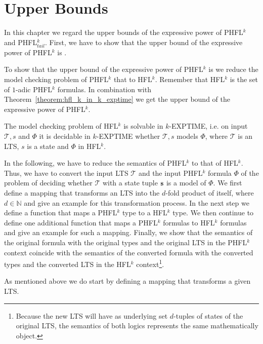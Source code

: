 
\chapter{Upper Bounds}\label{ch:upperBounds}

In this chapter we regard the upper bounds of the expressive power of PHFL$^k$ and PHFL$^k_{tail}$. First, we have to show that the upper
bound of the expressive power of PHFL$^k$ is .

To show that the upper bound of the expressive power of PHFL$^k$ is  we reduce the model checking
problem of PHFL$^k$ that to HFL$^k$. Remember that HFL$^k$ is the set of $1$-adic PHFL$^k$
formulas. In combination with Theorem~\ref{theorem:hfl_k_in_k_exptime} we get the upper bound of the expressive power of PHFL$^k$.

\begin{theorem}{\cite{axelsson2007complexity}}
    \label{theorem:hfl_k_in_k_exptime}
	The model checking problem of HFL$^k$ is solvable in $k$-EXPTIME, i.e. on input $\mathcal{T}, s$ and $\Phi$ it is decidable in $k$-EXPTIME whether $\mathcal{T}, s$ models $\Phi$, where $\mathcal{T}$ is an LTS, $s$ is a state and $\Phi$ in HFL$^k$.
\end{theorem}

In the following, we have to reduce the semantics of PHFL$^k$ to that of HFL$^k$.
Thus, we have to convert the input LTS $\mathcal{T}$ and the input PHFL$^k$ formula $\Phi$ of the problem of deciding whether
$\mathcal{T}$ with a state tuple $\emph{s}$ is a model of $\Phi$. We first define a mapping that transforms an LTS into the $d$-fold product of itself, where $d \in \mathbb{N}$
 and give an example for this transformation process. In the next step we define a function that maps a
PHFL$^k$ type to a HFL$^k$ type. We then continue to define one additional function that maps a PHFL$^k$ formulas to
HFL$^k$ formulas and give an example for such a mapping. Finally, we show that the semantics of the original
formula with the original types and the original LTS in the PHFL$^k$ context coincide with the semantics of the
converted formula with the converted types and the converted LTS in the HFL$^k$ context\footnote{Because the new LTS will have as underlying set $d$-tuples of states of the original LTS, the semantics of both logics represents the same mathematically object.}. 

As mentioned above we do start by defining a mapping that transforms a given LTS.

